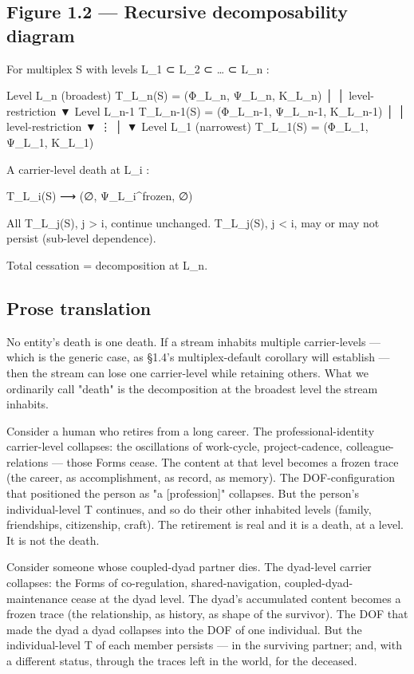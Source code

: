 \documentclass[11pt, openany]{book}
\begin{document}
\subsection{Figure 1.2 --- Recursive decomposability diagram}

\begin{Code}
For multiplex S with levels L_1 ⊂ L_2 ⊂ … ⊂ L_n :

    Level L_n (broadest)      T_{L_n}(S) = (Φ_{L_n}, Ψ_{L_n}, Κ_{L_n})
         │
         │   level-restriction
         ▼
    Level L_{n-1}             T_{L_{n-1}}(S) = (Φ_{L_{n-1}}, Ψ_{L_{n-1}}, Κ_{L_{n-1}})
         │
         │   level-restriction
         ▼
         ⋮
         │
         ▼
    Level L_1 (narrowest)     T_{L_1}(S) = (Φ_{L_1}, Ψ_{L_1}, Κ_{L_1})


A carrier-level death at L_i :

    T_{L_i}(S) ⟶ (∅, Ψ_{L_i}^frozen, ∅)

    All T_{L_j}(S), j > i, continue unchanged.
    T_{L_j}(S), j < i, may or may not persist (sub-level dependence).

Total cessation = decomposition at L_n.
\end{Code}

\subsection{Prose translation}

No entity's death is one death. If a stream inhabits multiple carrier-levels --- which is the generic case, as §1.4's multiplex-default corollary will establish --- then the stream can lose one carrier-level while retaining others. What we ordinarily call "death" is the decomposition at the broadest level the stream inhabits.

Consider a human who retires from a long career. The professional-identity carrier-level collapses: the oscillations of work-cycle, project-cadence, colleague-relations --- those Forms cease. The content at that level becomes a frozen trace (the career, as accomplishment, as record, as memory). The DOF-configuration that positioned the person as "a [profession]" collapses. But the person's individual-level T continues, and so do their other inhabited levels (family, friendships, citizenship, craft). The retirement is real and it is a death, at a level. It is not the death.

Consider someone whose coupled-dyad partner dies. The dyad-level carrier collapses: the Forms of co-regulation, shared-navigation, coupled-dyad-maintenance cease at the dyad level. The dyad's accumulated content becomes a frozen trace (the relationship, as history, as shape of the survivor). The DOF that made the dyad a dyad collapses into the DOF of one individual. But the individual-level T of each member persists --- in the surviving partner; and, with a different status, through the traces left in the world, for the deceased.
\end{document}
